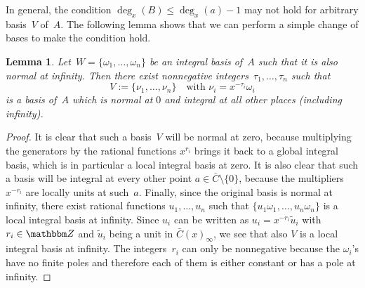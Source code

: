 \documentclass{sig-alternate}
\newtheorem{lemma}[theorem]{Lemma}
\let\set\mathbbm
\begin{document}
In general, the condition $\deg_x(B) \leq \deg_x(a)-1$ may not hold for arbitrary basis~$V$ of~$A$.
The following lemma shows that we can perform a simple change of bases to make the condition hold.

\begin{lemma}\label{LM:CB}
Let~$W =\{\omega_1, \ldots, \omega_n\}$ be an integral basis of~$A$ such that it is also normal at infinity. Then
there exist nonnegative integers~$\tau_1, \ldots, \tau_n$ such that
\[ V := \{\nu_1, \ldots, \nu_n\} \quad \text{with $\nu_i = x^{-\tau_i} \omega_i$}\]
is a basis of~$A$ which is normal at $0$ and integral at all other places (including infinity).
\end{lemma}
\begin{proof}
It is clear that such a basis~$V$ will be normal at zero, because multiplying the generators by
the rational functions $x^{r_i}$ brings it back to a global integral basis, which is in particular
a local integral basis at zero.
It is also clear that such a basis will be integral at every other point $a\in\bar C\setminus\{0\}$, because the
multipliers $x^{-r_i}$ are locally units at such~$a$.
Finally, since the original basis is normal at infinity, there exist rational functions $u_1,\dots,u_n$
such that $\{u_1\omega_1,\dots,u_n\omega_n\}$ is a local integral basis at infinity.
Since $u_i$ can be written as $u_i=x^{-r_i}\tilde{u}_i$ with $r_i\in\set Z$ and $\tilde{u}_i$ being a unit
in $\bar{C}(x)_\infty$, we see that also $V$ is a local integral basis at infinity.
The integers~$r_i$ can only be nonnegative because the $\omega_i$'s have no finite poles and therefore each
of them is either constant or has a pole at infinity.
\end{proof}
\end{document}
